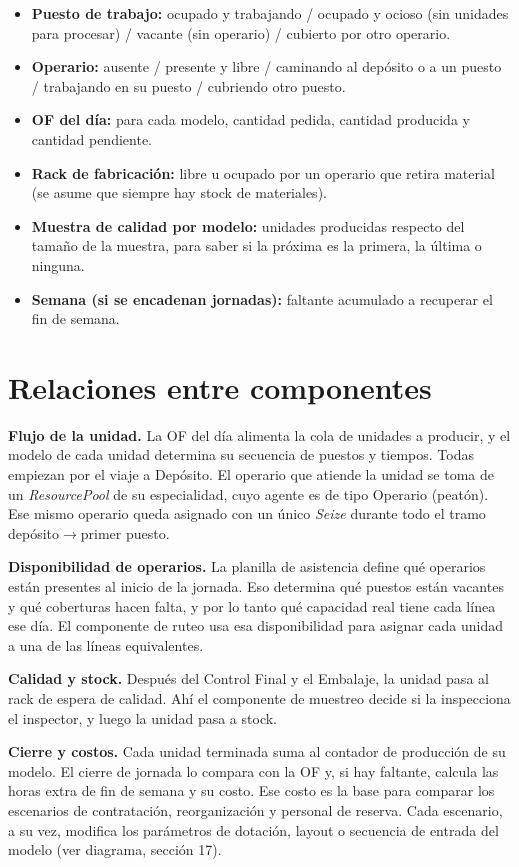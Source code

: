 \documentclass[11pt,a4paper]{article}
\begin{document}
\begin{itemize}
  \item \textbf{Puesto de trabajo:} ocupado y trabajando / ocupado y ocioso (sin unidades para procesar) / vacante (sin operario) / cubierto por otro operario.
  \item \textbf{Operario:} ausente / presente y libre / caminando al depósito o a un puesto / trabajando en su puesto / cubriendo otro puesto.
  \item \textbf{OF del día:} para cada modelo, cantidad pedida, cantidad producida y cantidad pendiente.
  \item \textbf{Rack de fabricación:} libre u ocupado por un operario que retira material (se asume que siempre hay stock de materiales).
  \item \textbf{Muestra de calidad por modelo:} unidades producidas respecto del tamaño de la muestra, para saber si la próxima es la primera, la última o ninguna.
  \item \textbf{Semana (si se encadenan jornadas):} faltante acumulado a recuperar el fin de semana.
\end{itemize}

\section{Relaciones entre componentes}

\textbf{Flujo de la unidad.} La OF del día alimenta la cola de unidades a producir, y el modelo de cada unidad determina su secuencia de puestos y tiempos. Todas empiezan por el viaje a Depósito. El operario que atiende la unidad se toma de un \emph{ResourcePool} de su especialidad, cuyo agente es de tipo Operario (peatón). Ese mismo operario queda asignado con un único \emph{Seize} durante todo el tramo depósito\(\rightarrow\)primer puesto.

\textbf{Disponibilidad de operarios.} La planilla de asistencia define qué operarios están presentes al inicio de la jornada. Eso determina qué puestos están vacantes y qué coberturas hacen falta, y por lo tanto qué capacidad real tiene cada línea ese día. El componente de ruteo usa esa disponibilidad para asignar cada unidad a una de las líneas equivalentes.

\textbf{Calidad y stock.} Después del Control Final y el Embalaje, la unidad pasa al rack de espera de calidad. Ahí el componente de muestreo decide si la inspecciona el inspector, y luego la unidad pasa a stock.

\textbf{Cierre y costos.} Cada unidad terminada suma al contador de producción de su modelo. El cierre de jornada lo compara con la OF y, si hay faltante, calcula las horas extra de fin de semana y su costo. Ese costo es la base para comparar los escenarios de contratación, reorganización y personal de reserva. Cada escenario, a su vez, modifica los parámetros de dotación, layout o secuencia de entrada del modelo (ver diagrama, sección 17).
\end{document}

